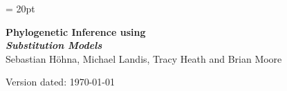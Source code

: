 \documentclass[11pt]{article}
\begin{document}
\renewcommand{\headrulewidth}{0.5pt}
\headsep = 20pt
\lhead{ }

\thispagestyle{plain}
\begin{center}

\textbf{\LARGE Phylogenetic Inference using \RevBayes}\\\vspace{2mm}
\textbf{\it{\Large Substitution Models}}\\\vspace{2mm}
\vspace{1cm}
{\Large Sebastian H{\"o}hna, Michael Landis, Tracy Heath and Brian Moore}
\vspace{1cm}
\end{center}

\def \ResourcePath {./}
\def \GlobalResourcePath {../}


Version dated: \today
\end{document}
